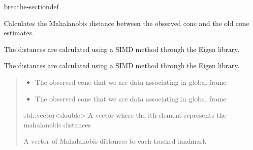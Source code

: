 \documentclass[letterpaper,10pt,english]{sphinxmanual}
\begin{document}
\begin{fulllineitems}
\begin{sphinxuseclass}{breathe-sectiondef}
\begin{fulllineitems}
\label{\detokenize{isam2:_CPPv4N4slam14SLAMEstAndMCov15calculate_mdistEN5gtsam6Point2E}}\label{\detokenize{isam2:_CPPv3N4slam14SLAMEstAndMCov15calculate_mdistEN5gtsam6Point2E}}\label{\detokenize{isam2:_CPPv2N4slam14SLAMEstAndMCov15calculate_mdistEN5gtsam6Point2E}}\label{\detokenize{isam2:slam::SLAMEstAndMCov::calculate_mdist__gtsam::Point2}}
\pysigstartsignatures
\pysigstartmultiline
\pysiglinewithargsret
{\label{\detokenize{isam2:classslam_1_1SLAMEstAndMCov_1abf9bea4abd413e68825dbedc81590593}}}
{}
{}
\pysigstopmultiline
\pysigstopsignatures
\sphinxAtStartPar
Calculates the Mahalanobis distance between the observed cone and the old cone estimates. 

\sphinxAtStartPar
The distances are calculated using a SIMD method through the Eigen library.

\sphinxAtStartPar

The distances are calculated using a SIMD method through the Eigen library.
\begin{quote}\begin{description}
\begin{itemize}
\item {} 
\sphinxAtStartPar
{} \textendash{} The observed cone that we are data associating in global frame 

\item {} 
\sphinxAtStartPar
{} \textendash{} The observed cone that we are data associating in global frame 

\end{itemize}

\sphinxAtStartPar
std::vector\textless{}double\textgreater{} A vector where the ith element represents the mahalanobis distances

\sphinxAtStartPar
A vector of Mahalanobis distances to each tracked landmark 

\end{description}\end{quote}


\end{fulllineitems}
\end{sphinxuseclass}
\end{fulllineitems}
\end{document}
